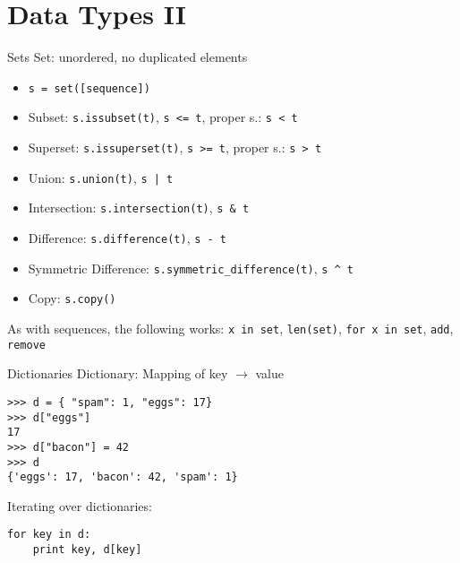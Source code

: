 \section{Data Types II}

\begin{frame}[fragile]{Sets}
\alert{Set}: unordered, no duplicated elements
\begin{itemize}
\item \lstinline{s = set([sequence])}
\item \alert{Subset}: \lstinline{s.issubset(t)}, \lstinline{s <= t}, proper s.: \lstinline{s < t}
\item \alert{Superset}: \lstinline{s.issuperset(t)}, \lstinline{s >= t}, proper s.: \lstinline{s > t} 
\item \alert{Union}: \lstinline{s.union(t)}, \lstinline{s | t}
\item \alert{Intersection}: \lstinline{s.intersection(t)}, \lstinline{s & t}
\item \alert{Difference}: \lstinline{s.difference(t)}, \lstinline{s - t}
\item Symmetric Difference: \lstinline{s.symmetric_difference(t)}, \lstinline{s ^ t}
\item Copy: \lstinline{s.copy()}
\end{itemize}
As with sequences, the following works: \lstinline{x in set}, \lstinline{len(set)}, \lstinline{for x in set}, \lstinline{add}, \lstinline{remove}
\end{frame}

\begin{frame}[fragile]{Dictionaries}
\alert{Dictionary}: Mapping of key $\rightarrow$ value
\begin{lstlisting}[style=Shell]
>>> d = { "spam": 1, "eggs": 17}
>>> d["eggs"]
17
>>> d["bacon"] = 42
>>> d
{'eggs': 17, 'bacon': 42, 'spam': 1}
\end{lstlisting}
Iterating over dictionaries:
\begin{lstlisting}[style=Python]
for key in d:
    print key, d[key]
\end{lstlisting}
\end{frame}

